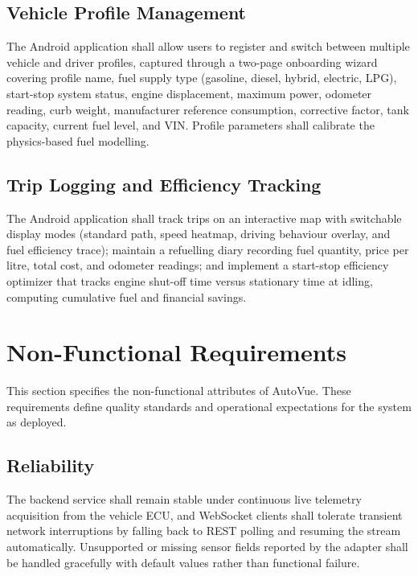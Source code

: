 \documentclass[10pt,a4paper]{report}
\begin{document}
\subsection{Vehicle Profile Management}
The Android application shall allow users to register and switch between multiple vehicle and driver profiles, captured through a two-page onboarding wizard covering profile name, fuel supply type (gasoline, diesel, hybrid, electric, LPG), start-stop system status, engine displacement, maximum power, odometer reading, curb weight, manufacturer reference consumption, corrective factor, tank capacity, current fuel level, and VIN. Profile parameters shall calibrate the physics-based fuel modelling. \par

\subsection{Trip Logging and Efficiency Tracking}
The Android application shall track trips on an interactive map with switchable display modes (standard path, speed heatmap, driving behaviour overlay, and fuel efficiency trace); maintain a refuelling diary recording fuel quantity, price per litre, total cost, and odometer readings; and implement a start-stop efficiency optimizer that tracks engine shut-off time versus stationary time at idling, computing cumulative fuel and financial savings. \par

\section{Non-Functional Requirements}

This section specifies the non-functional attributes of AutoVue. These requirements define quality standards and operational expectations for the system as deployed.

\subsection{Reliability}
The backend service shall remain stable under continuous live telemetry acquisition from the vehicle ECU, and WebSocket clients shall tolerate transient network interruptions by falling back to REST polling and resuming the stream automatically. Unsupported or missing sensor fields reported by the adapter shall be handled gracefully with default values rather than functional failure. \par
\end{document}
